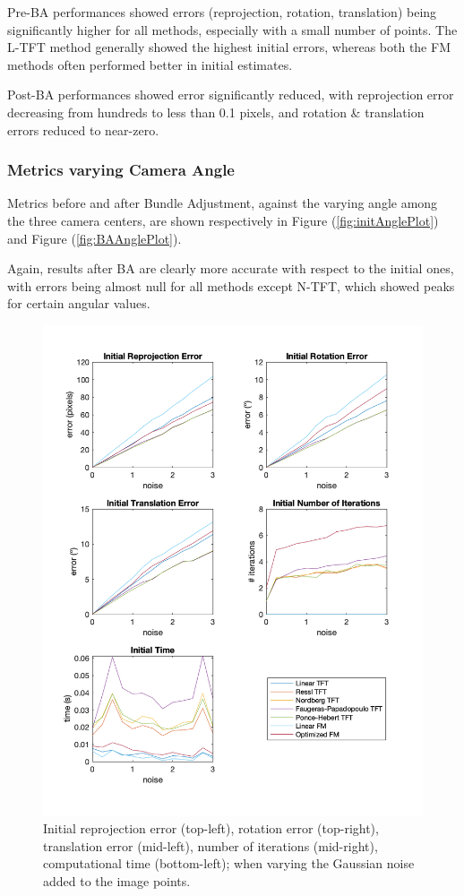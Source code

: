 Pre-\acs{BA} performances showed errors (reprojection, rotation, translation) being significantly higher for all methods, especially with a small number of points. The \acs{L-TFT} method generally showed the highest initial errors, whereas both the \acs{FM} methods often performed better in initial estimates.

Post-\acs{BA} performances showed error significantly reduced, with reprojection error decreasing from hundreds to less than 0.1 pixels, and rotation \& translation errors reduced to near-zero.

\subsubsection*{Metrics varying Camera Angle}
Metrics before and after Bundle Adjustment, against the varying angle among the three camera centers, are shown respectively in Figure (\ref{fig:initAnglePlot}) and Figure (\ref{fig:BAAnglePlot}).

Again, results after \acs{BA} are clearly more accurate with respect to the initial ones, with errors being almost null for all methods except \acs{N-TFT}, which showed peaks for certain angular values.

\begin{figure}[p]
	\centering
	\includegraphics[width=1\textwidth]{Experiments/Synthetic/noise/INITnoisePlots.png}
	\caption[Synthetic Trial varying Gaussian Noise]{Initial reprojection error (top-left), rotation error (top-right), translation error (mid-left), number of iterations (mid-right), computational time (bottom-left); when varying the Gaussian noise added to the image points.}
	\label{fig:initNoisePlot}
\end{figure}

